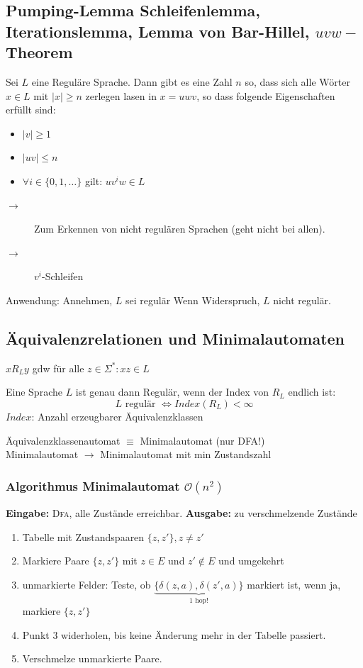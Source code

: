 \documentclass{scrartcl}
\begin{document}
\subsection*{Pumping-Lemma {\tiny Schleifenlemma, Iterationslemma, Lemma von Bar-Hillel, $uvw-$Theorem}} %
\begin{shaded}
    Sei $L$ eine Reguläre Sprache. Dann gibt es eine Zahl $n$ so, dass sich alle Wörter $x\in L$ mit $|x|\geq n$ zerlegen lasen in $x=uwv$, so dass folgende Eigenschaften erfüllt sind:
    \begin{itemize}
        \item $|v|\geq1$
        \item $|uv|\leq n$
        \item $\forall i\in\{0,1,\dots\}$ gilt: $uv^iw\in L$
    \end{itemize}
\end{shaded}
\begin{description}
    \item[$\to$] Zum Erkennen von nicht regulären Sprachen (geht nicht bei allen).
    \item[$\to$] $v^i$-Schleifen
\end{description}
Anwendung: Annehmen, $L$ sei regulär \follows Wenn Widerspruch, $L$ nicht regulär.

\subsection{Äquivalenzrelationen und Minimalautomaten}
$xR_Ly$ gdw für alle $z\in\Sigma^*: xz\in L$
\begin{shaded}
    Eine Sprache $L$ ist genau dann Regulär, wenn der Index von $R_L$ endlich ist:
    \[L \textrm{ regulär } \Leftrightarrow Index(R_L) < \infty \]
    {\tiny $Index$: Anzahl erzeugbarer Äquivalenzklassen}
\end{shaded}

Äquivalenzklassenautomat $\equiv$ Minimalautomat (nur DFA!) \\
Minimalautomat $\to$ Minimalautomat mit min Zustandszahl

\subsubsection*{Algorithmus Minimalautomat $\mathcal{O}(n^2)$}
\textbf{Eingabe:} \textsc{Dfa}, alle Zustände erreichbar.
\textbf{Ausgabe:} zu verschmelzende Zustände
\begin{enumerate}
    \item Tabelle mit Zustandspaaren $\{z,z'\}, z\not= z'$
    \item Markiere Paare $\{z,z'\}$ mit $z\in E$ und $z'\not\in E$ und umgekehrt
    \item unmarkierte Felder: Teste, ob $\underset{1\textrm{ hop!}}{\underbrace{\{\delta(z,a),\delta(z',a)\}}}$ markiert ist, wenn ja, markiere $\{z,z'\}$
    \item Punkt $3$ widerholen, bis keine Änderung mehr in der Tabelle passiert.
    \item Verschmelze unmarkierte Paare.
\end{enumerate}
\end{document}
